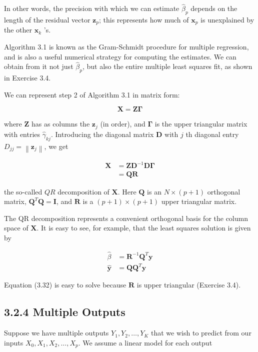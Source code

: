 \documentclass[10pt]{article}
\begin{document}
In other words, the precision with which we can estimate $\hat{\beta}_{p}$ depends on the length of the residual vector $\mathbf{z}_{p}$; this represents how much of $\mathbf{x}_{p}$ is unexplained by the other $\mathbf{x}_{k}$ 's.

Algorithm 3.1 is known as the Gram-Schmidt procedure for multiple regression, and is also a useful numerical strategy for computing the estimates. We can obtain from it not just $\hat{\beta}_{p}$, but also the entire multiple least squares fit, as shown in Exercise 3.4.

We can represent step 2 of Algorithm 3.1 in matrix form:


\begin{equation*}
\mathbf{X}=\mathbf{Z} \boldsymbol{\Gamma} \tag{3.30}
\end{equation*}


where $\mathbf{Z}$ has as columns the $\mathbf{z}_{j}$ (in order), and $\boldsymbol{\Gamma}$ is the upper triangular matrix with entries $\hat{\gamma}_{k j}$. Introducing the diagonal matrix $\mathbf{D}$ with $j$ th diagonal entry $D_{j j}=\left\|\mathbf{z}_{j}\right\|$, we get


\begin{align*}
\mathbf{X} & =\mathbf{Z D}^{-1} \mathbf{D} \mathbf{\Gamma} \\
& =\mathbf{Q R} \tag{3.31}
\end{align*}


the so-called $Q R$ decomposition of $\mathbf{X}$. Here $\mathbf{Q}$ is an $N \times(p+1)$ orthogonal matrix, $\mathbf{Q}^{T} \mathbf{Q}=\mathbf{I}$, and $\mathbf{R}$ is a $(p+1) \times(p+1)$ upper triangular matrix.

The QR decomposition represents a convenient orthogonal basis for the column space of $\mathbf{X}$. It is easy to see, for example, that the least squares solution is given by


\begin{align*}
\hat{\beta} & =\mathbf{R}^{-1} \mathbf{Q}^{T} \mathbf{y}  \tag{3.32}\\
\hat{\mathbf{y}} & =\mathbf{Q} \mathbf{Q}^{T} \mathbf{y} \tag{3.33}
\end{align*}


Equation (3.32) is easy to solve because $\mathbf{R}$ is upper triangular (Exercise 3.4).

\subsection*{3.2.4 Multiple Outputs}
Suppose we have multiple outputs $Y_{1}, Y_{2}, \ldots, Y_{K}$ that we wish to predict from our inputs $X_{0}, X_{1}, X_{2}, \ldots, X_{p}$. We assume a linear model for each output
\end{document}
